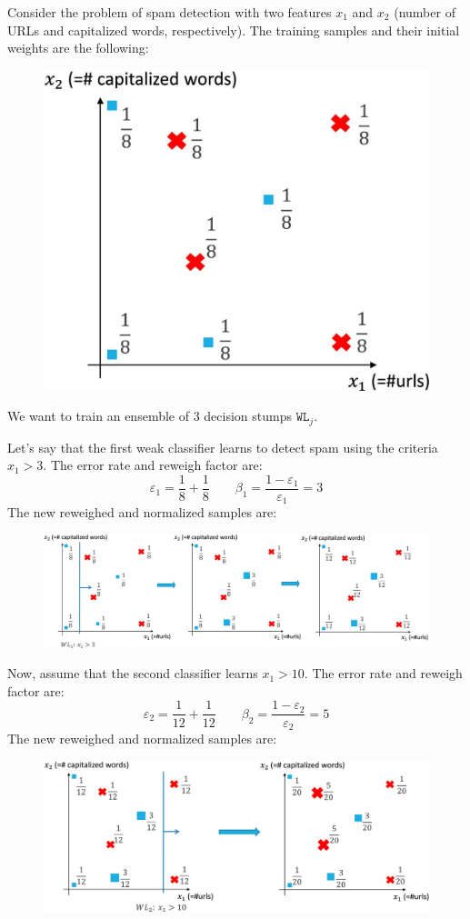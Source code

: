 \begin{description}
        \begin{example}
            \small
            Consider the problem of spam detection with two features $x_1$ and $x_2$ (number of URLs and capitalized words, respectively).
            The training samples and their initial weights are the following:
            \begin{figure}[H]
                \centering
                \includegraphics[width=0.3\linewidth]{./img/_adaboost_example1.jpg}
            \end{figure}
            We want to train an ensemble of $3$ decision stumps $\texttt{WL}_{j}$.

            Let's say that the first weak classifier learns to detect spam using the criteria $x_1 > 3$. The error rate and reweigh factor are:
            \[
                \varepsilon_1 = \frac{1}{8} + \frac{1}{8} \qquad
                \beta_1 = \frac{1 - \varepsilon_1}{\varepsilon_1} = 3
            \]
            The new reweighed and normalized samples are:
            \begin{figure}[H]
                \centering
                \includegraphics[width=0.9\linewidth]{./img/_adaboost_example2.jpg}
            \end{figure}

            Now, assume that the second classifier learns $x_1 > 10$. The error rate and reweigh factor are:
            \[ \varepsilon_2 = \frac{1}{12} + \frac{1}{12} \qquad
            \beta_2 = \frac{1 - \varepsilon_2}{\varepsilon_2} = 5 \]
            The new reweighed and normalized samples are:
            \begin{figure}[H]
                \centering
                \includegraphics[width=0.7\linewidth]{./img/_adaboost_example3.jpg}
            \end{figure}


\end{example}
\end{description}
